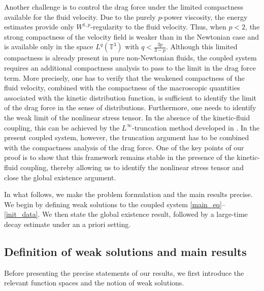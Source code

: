 \documentclass[10pt,reqno]{amsart}
\numberwithin{equation}{section}
\newcommand{\T}{\mathbb T}
\begin{document}
Another challenge is to control the drag force under the limited compactness available for the fluid velocity. Due to the purely $p$-power viscosity, the energy estimates provide only $W^{1,p}$-regularity to the fluid velocity. Thus, when $p<2$, the strong compactness of the velocity field is weaker than in the Newtonian case and is available only in the space $L^q(\T^3)$ with $q < \frac{3p}{3-p}$. Although this limited compactness is already present in pure non-Newtonian fluids, the coupled system requires an additional compactness analysis to pass to the limit in the drag force term. More precisely, one has to verify that the weakened compactness of the fluid velocity, combined with the compactness of the macroscopic quantities associated with the kinetic distribution function, is sufficient to identify the limit of the drag force in the sense of distributions. Furthermore, one needs to identify the weak limit of the nonlinear stress tensor. In the absence of the kinetic-fluid coupling, this can be achieved by the $L^\infty$-truncation method developed in \cite{FMS00}. In the present coupled system, however, the truncation argument has to be combined with the compactness analysis of the drag force. One of the key points of our proof is to show that this framework remains stable in the presence of the kinetic-fluid coupling, thereby allowing us to identify the nonlinear stress tensor and close the global existence argument. 


%
%
%                      
%
%

In what follows, we make the problem formulation and the main results precise. We begin by defining weak solutions to the coupled system \eqref{main_eq}--\eqref{init_data}. We then state the global existence result, followed by a large-time decay estimate under an a priori setting.

%
%
% 
%
%
\subsection{Definition of weak solutions and main results}
Before presenting the precise statements of our results, we first introduce the relevant function spaces and the notion of weak solutions. 
\end{document}
